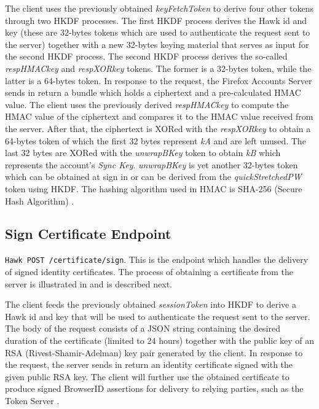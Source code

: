 The client uses the previously obtained \textit{keyFetchToken} to derive four other tokens through two HKDF processes. The first HKDF process derives the Hawk id and key (these are 32-bytes tokens which are used to authenticate the request sent to the server) together with a new 32-bytes keying material that serves as input for the second HKDF process. The second HKDF process derives the so-called \textit{respHMACkey} and \textit{respXORkey} tokens. The former is a 32-bytes token, while the latter is a 64-bytes token. In response to the request, the Firefox Accounts Server sends in return a bundle which holds a ciphertext and a pre-calculated HMAC value. The client uses the previously derived \textit{respHMACkey} to compute the HMAC value of the ciphertext and compares it to the HMAC value received from the server. After that, the ciphertext is XORed with the \textit{respXORkey} to obtain a 64-bytes token of which the first 32 bytes represent \textit{kA} and are left unused. The last 32 bytes are XORed with the \textit{unwrapBKey} token to obtain \textit{kB} which represents the account's \textit{Sync Key}. \textit{unwrapBKey} is yet another 32-bytes token which can be obtained at sign in or can be derived from the \textit{quickStretchedPW} token using HKDF. The hashing algorithm used in HMAC is SHA-256 (Secure Hash Algorithm) \cite{onepw-protocol}.

\subsection{Sign Certificate Endpoint}
\label{sub-sec:sign-certificate-endpoint}

{\tt Hawk POST /certificate/sign}. This is the endpoint which handles the delivery of signed identity certificates. The process of obtaining a certificate from the server is illustrated in  and is described next.


The client feeds the previously obtained \textit{sessionToken} into HKDF to derive a Hawk id and key that will be used to authenticate the request sent to the server. The body of the request consists of a JSON string containing the desired duration of the certificate (limited to 24 hours) together with the public key of an RSA (Rivest-Shamir-Adelman) key pair generated by the client. In response to the request, the server sends in return an identity certificate signed with the given public RSA key. The client will further use the obtained certificate to produce signed BrowserID assertions for delivery to relying parties, such as the Token Server \cite{onepw-protocol}.

